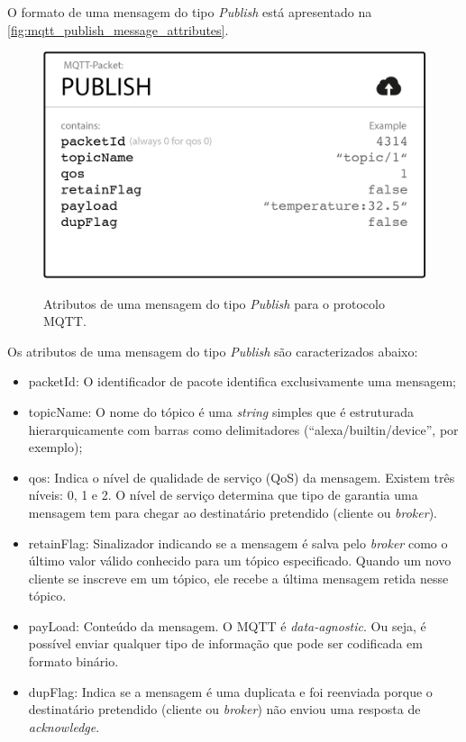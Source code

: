 O formato de uma mensagem do tipo \textit{Publish} está apresentado na \autoref{fig:mqtt_publish_message_attributes}.

\begin{figure}[htbp]
	\centering
	\caption{Atributos de uma mensagem do tipo \textit{Publish} para o protocolo MQTT.}
	\includegraphics[scale=0.5]{Imagens/mqtt_publish_message_attributes.png}
	\label{fig:mqtt_publish_message_attributes}
\end{figure}

Os atributos de uma mensagem do tipo \textit{Publish} são caracterizados abaixo:

\begin{itemize}
	\item packetId: O identificador de pacote identifica exclusivamente uma mensagem;
	\item topicName: O nome do tópico é uma \textit{string} simples que é estruturada hierarquicamente com barras como delimitadores (“alexa/builtin/device”, por exemplo);
	\item qos: Indica o nível de qualidade de serviço (QoS) da mensagem. Existem três níveis: 0, 1 e 2. O nível de serviço determina que tipo de garantia uma mensagem tem para chegar ao destinatário pretendido (cliente ou \textit{broker}).
	\item retainFlag: Sinalizador indicando se a mensagem é salva pelo \textit{broker} como o último valor válido conhecido para um tópico especificado. Quando um novo cliente se inscreve em um tópico, ele recebe a última mensagem retida nesse tópico.
	\item payLoad: Conteúdo da mensagem. O MQTT é \textit{data-agnostic}. Ou seja, é possível enviar qualquer tipo de informação que pode ser codificada em formato binário.
	\item dupFlag: Indica se a mensagem é uma duplicata e foi reenviada porque o destinatário pretendido (cliente ou \textit{broker}) não enviou uma resposta de \textit{acknowledge}.
\end{itemize}

